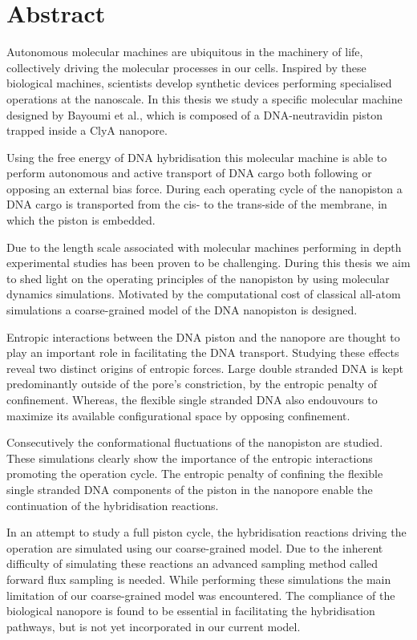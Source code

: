 \chapter*{Abstract}

Autonomous molecular machines are ubiquitous in the machinery of life, collectively
driving the molecular processes in our cells. Inspired by these biological machines,
scientists
develop synthetic devices performing specialised operations at the nanoscale. In this
thesis we study a specific molecular machine designed by Bayoumi et al.\cite{Bayoumi21},
which is composed of a DNA-neutravidin piston trapped inside a ClyA nanopore.

Using the free energy of DNA hybridisation this molecular machine is able to perform
autonomous and active transport of DNA cargo both following or opposing an
external bias force. During each operating cycle of the nanopiston a DNA cargo
is transported from the cis- to the trans-side of the membrane, in which the piston is
embedded.

Due to the length scale associated with molecular machines performing in depth
experimental studies has been proven to be challenging. During this thesis we aim
to shed light on the operating principles of the nanopiston by using molecular dynamics
simulations. Motivated by the computational cost of classical all-atom simulations a
coarse-grained model of the DNA nanopiston is designed.

Entropic interactions between the DNA piston and the nanopore are thought to
play an important role in facilitating the DNA transport. Studying these effects reveal
two distinct origins of entropic forces. Large double stranded DNA is kept predominantly
outside of the pore's constriction, by the entropic penalty of confinement.  Whereas, the
flexible single stranded DNA also
endouvours to maximize its available configurational space by opposing confinement.

Consecutively the  conformational fluctuations of
the nanopiston are studied.  These simulations clearly show the importance of the
entropic interactions promoting the operation cycle.  The entropic
penalty of confining the flexible single stranded DNA components of the piston in the
nanopore enable the continuation of the hybridisation reactions.

In an attempt to study a full piston cycle, the hybridisation reactions driving the
operation are simulated using our coarse-grained
model. Due to the inherent difficulty of simulating these reactions an advanced
sampling method called forward flux sampling is needed.
While performing these simulations the main limitation of our coarse-grained model was
encountered. The compliance of the biological nanopore is found to be essential in
facilitating the hybridisation pathways, but is not yet incorporated in our current
model.

